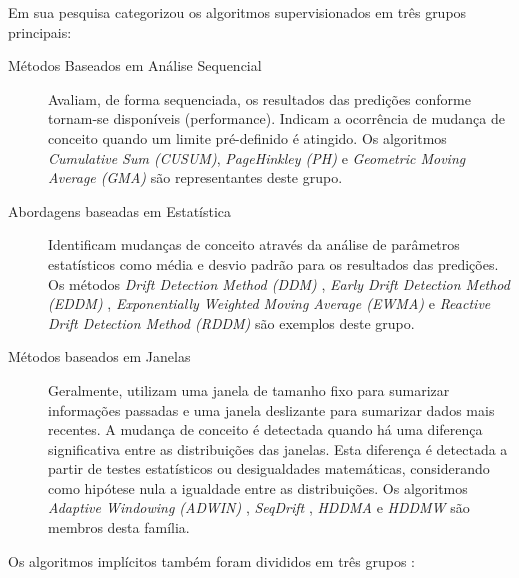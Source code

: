 \documentclass[qual, classic, a4paper]{ufbathesis}
\begin{document}
Em sua pesquisa \cite{Gama:2014:SCD:2597757.2523813} categorizou os algoritmos supervisionados em três grupos principais:

\begin{description}
    \item[Métodos Baseados em Análise Sequencial] Avaliam, de forma sequenciada, os resultados das predições conforme tornam-se disponíveis (performance).
    Indicam a ocorrência de mudança de conceito quando um limite pré-definido é atingido.
    Os algoritmos \textit{Cumulative Sum (CUSUM)}, \textit{PageHinkley (PH)} \cite{Page:CUSUM:PageHinkley:1954} e \textit{Geometric Moving Average (GMA)} \cite{Roberts:2000:CCT:338441.338464}
    são representantes deste grupo.

    \item[Abordagens baseadas em Estatística] Identificam mudanças de conceito através da análise de parâmetros estatísticos como média e desvio padrão para os resultados das predições.
    Os métodos \textit{Drift Detection Method (DDM)} \cite{GamaMCR04}, 
    \textit{Early Drift Detection Method (EDDM)} \cite{EDDM}, 
    \textit{Exponentially Weighted Moving Average (EWMA)} \cite{Ross:2012:EWM:2076039.2076307} e 
    \textit{Reactive Drift Detection Method (RDDM)} \cite{Barros:RDDM:2017} são exemplos deste grupo.

    \item[Métodos baseados em Janelas] Geralmente, utilizam uma janela de tamanho fixo para sumarizar informações passadas e uma janela deslizante para sumarizar dados mais recentes.
    A mudança de conceito é detectada quando há uma diferença significativa entre as distribuições das janelas.
    Esta diferença é detectada a partir de testes estatísticos ou desigualdades matemáticas, considerando como hipótese nula a igualdade entre as distribuições.
    Os algoritmos 
    \textit{Adaptive Windowing (ADWIN)} \cite{BifetG07}, 
    \textit{SeqDrift} \cite{PearsSK14:SeqDrift:2014}, 
    \textit{HDDMA} e \textit{HDDMW} \cite{BlancoCRBDM15:HDDMA:HDDMW:2015}
    são membros desta família.
\end{description}

Os algoritmos implícitos também foram divididos em três grupos \cite{GONCALVES20148144}:
\end{document}
